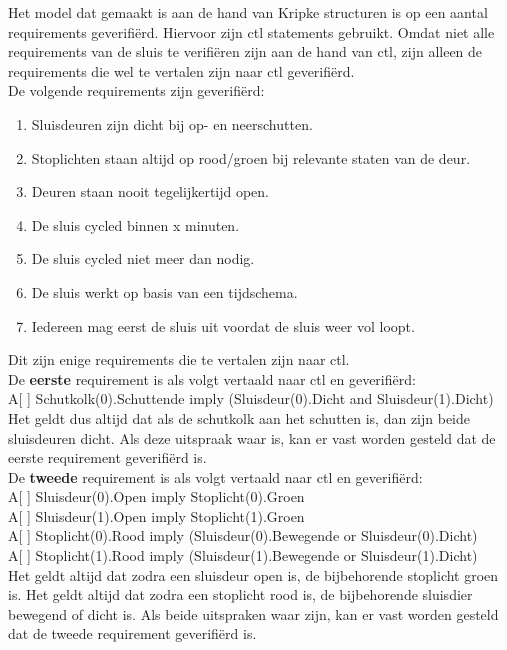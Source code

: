 \documentclass[../verslag.tex]{subfiles}
\begin{document}
Het  model dat gemaakt is aan de hand van Kripke structuren is op een aantal requirements geverifiërd.
Hiervoor zijn ctl statements gebruikt.
Omdat niet alle requirements van de sluis te verifiëren zijn aan de hand van ctl, zijn alleen de requirements die wel te vertalen zijn naar ctl geverifiërd. \\
De volgende requirements zijn geverifiërd:
\begin{enumerate}
    \item Sluisdeuren zijn dicht bij op- en neerschutten.
    \item Stoplichten staan altijd op rood/groen bij relevante staten van de deur.
    \item Deuren staan nooit tegelijkertijd open.  
    \item De sluis cycled binnen x minuten.
    \item De sluis cycled niet meer dan nodig.
    \item De sluis werkt op basis van een tijdschema.
    \item Iedereen mag eerst de sluis uit voordat de sluis weer vol loopt.
\end{enumerate}
Dit zijn enige requirements die te vertalen zijn naar ctl. \\

De \textbf{eerste} requirement is als volgt vertaald naar ctl en geverifiërd: \\
A[ ] Schutkolk(0).Schuttende imply (Sluisdeur(0).Dicht and Sluisdeur(1).Dicht) \\

Het geldt dus altijd dat als de schutkolk aan het schutten is, dan zijn beide sluisdeuren dicht.
Als deze uitspraak waar is, kan er vast worden gesteld dat de eerste requirement geverifiërd is. \\

De \textbf{tweede} requirement is als volgt vertaald naar ctl en geverifiërd: \\
A[ ] Sluisdeur(0).Open imply Stoplicht(0).Groen \\
A[ ] Sluisdeur(1).Open imply Stoplicht(1).Groen \\
A[ ] Stoplicht(0).Rood imply (Sluisdeur(0).Bewegende or Sluisdeur(0).Dicht) \\
A[ ] Stoplicht(1).Rood imply (Sluisdeur(1).Bewegende or Sluisdeur(1).Dicht) \\

Het geldt altijd dat zodra een sluisdeur open is, de bijbehorende stoplicht groen is.
Het geldt altijd dat zodra een stoplicht rood is, de bijbehorende sluisdier bewegend of dicht is.
Als beide uitspraken waar zijn, kan er vast worden gesteld dat de tweede requirement geverifiërd is. \\
\end{document}
